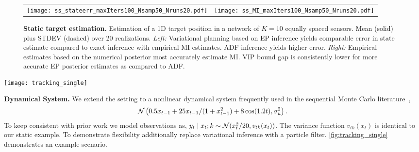 \begin{figure}
  \centering
  \begin{tabular}{cc}
    \hspace{-3mm}\texttt{[image: ss\_stateerr\_maxIters100\_Nsamp50\_Nruns20.pdf]} &
    \hspace{-5mm}\texttt{[image: ss\_MI\_maxIters100\_Nsamp50\_Nruns20.pdf]}
  \end{tabular}
  
  \caption{\small\textbf{Static target estimation.} Estimation of a 1D
    target position in a network of $K=10$ equally spaced sensors.
    Mean (solid) plus STDEV (dashed) over 20 realizations.  \emph{Left:}
    Variational planning based on EP inference yields comparable error
    in state estimate compared to exact inference with empirical MI
    estimates. ADF inference yields higher error.  \emph{Right:}
    Empirical estimates based on the numerical posterior most
    accurately estimate MI.  VIP bound gap is consistently lower for
    more accurate EP posterior estimates as compared to
    ADF.}
  \label{fig:static}
\end{figure}

\begin{figure*}[!t]
  \centering
  \hspace{-3mm}
  \texttt{[image: tracking\_single]}

  \caption{\small\textbf{Nonlinear tracking example} in a field of
    $K=10$ equally spaced, stationary, sensors.  The best comparison
    is to numerical approximation to MI and the posterior distribution
    (\emph{top-center}).  For reference, we have also included an
    \emph{oracle} which selects the sensor closest to the true target
    location (\emph{left column}).  In typical cases such as this one,
    we see that VIP state error is comparable to empirical estimation
    under the same posterior approximation.  However, VIP shows lower
    accuracy when planning is computed against an approximate
    posterior, in this case particle filtering (PF).}

  \label{fig:tracking_single}
\end{figure*}

\textbf{Dynamical System.} We extend the setting to a nonlinear
dynamical system frequently used in the sequential Monte Carlo
literature~\citep{kitagawa1996monte, gordon1993novel,
  cappe2007overview},
\[
  \mathcal{N}\left(0.5 x_{t-1} + 25 x_{t-1} / (1+x_{t-1}^2)
  + 8 \cos(1.2t), \sigma_u^2\right).
\]
To keep consistent with prior work we model observations
as, \mbox{$y_t \mid x_t; k \sim \mathcal{N}(x_t^2/20, v_{tk}(x_t))$}.  The
variance function $v_{tk}(x_t)$ is identical to our static example.
To demonstrate flexibility additionally replace variational inference
with a particle filter.  \FIG\ref{fig:tracking_single} demonstrates an
example scenario.

